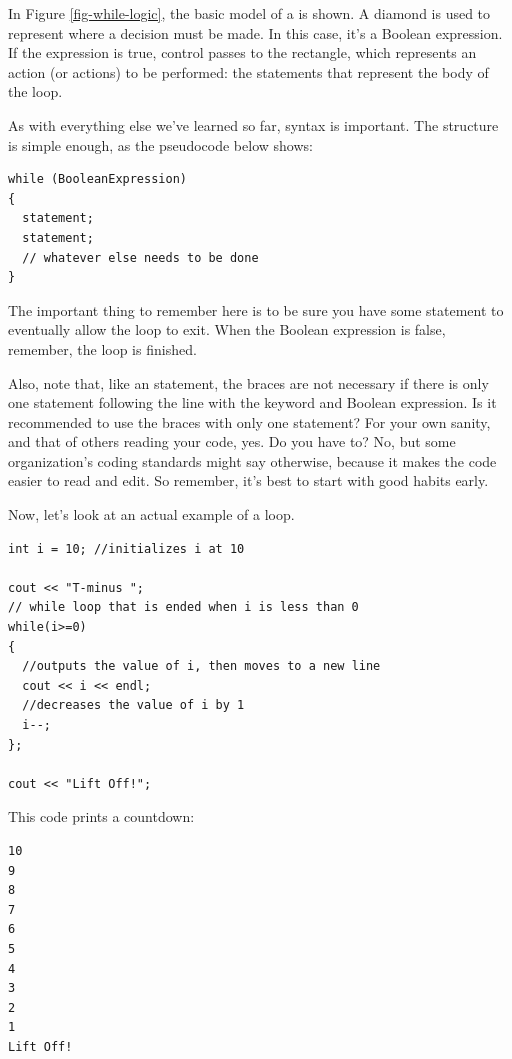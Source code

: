 In Figure \ref{fig-while-logic}, the basic model of a  is shown.
A diamond is used to represent where a decision must be made.
In this case, it's a Boolean expression.
If the expression is true, control passes to the rectangle, which represents an action (or actions) to be performed: the statements that represent the body of the loop.

As with everything else we've learned so far, syntax is important. The structure is simple enough, as the pseudocode below shows:

\noindent\begin{minipage}{\linewidth}\begin{lstlisting}
while (BooleanExpression)
{
  statement;
  statement;
  // whatever else needs to be done
}
\end{lstlisting}\end{minipage}

The important thing to remember here is to be sure you have some statement to eventually allow the loop to exit.
When the Boolean expression is false, remember, the loop is finished.

Also, note that, like an  statement, the braces are not necessary if there is only one statement following the line with the  keyword and Boolean expression.
Is it recommended to use the braces with only one statement?
For your own sanity, and that of others reading your code, yes.
Do you have to?
No, but some organization's coding standards might say otherwise, because it makes the code easier to read and edit.
So remember, it's best to start with good habits early.

Now, let's look at an actual example of a  loop.

\noindent\begin{minipage}{\linewidth}\begin{lstlisting}
int i = 10;	//initializes i at 10

cout << "T-minus ";
// while loop that is ended when i is less than 0
while(i>=0)	
{ 
  //outputs the value of i, then moves to a new line
  cout << i << endl;	
  //decreases the value of i by 1
  i--;	
};

cout << "Lift Off!";
\end{lstlisting}\end{minipage}

This code prints a countdown:

\noindent\begin{minipage}{\linewidth}\begin{lstlisting}
10
9
8
7
6
5
4
3
2
1
Lift Off!
\end{lstlisting}\end{minipage}


